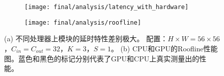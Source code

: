 \begin{figure}[ht]
    \centering
    \begin{subfigure}[b]{0.96\linewidth}
        \centering
        \texttt{[image: final/analysis/latency\_with\_hardware]}
    	\caption{\label{fig:latency_with_hardware}}
    \end{subfigure}
    \begin{subfigure}[b]{0.96\linewidth}
        \centering
        \texttt{[image: final/analysis/roofline]}
        \caption{\label{fig:roofline}}
    \end{subfigure}
    \caption{
        (a) 不同处理器上模块的延时特性差别极大。
        配置：$H\times W=56 \times 56$，$C_{in}=C_{out}=32$，$K=3$，$S=1$。
        (b) CPU和GPU的Roofline性能图。蓝色和黑色的标记分别代表了GPU和CPU上真实测量出的性能。
    }
\end{figure}